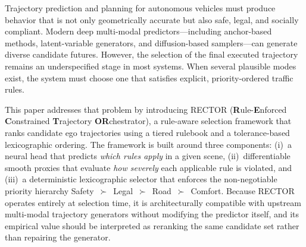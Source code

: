 Trajectory prediction and planning for autonomous vehicles must produce behavior that is not only geometrically accurate but also safe, legal, and socially compliant. Modern deep multi-modal predictors—including anchor-based methods, latent-variable generators, and diffusion-based samplers—can generate diverse candidate futures. However, the selection of the final executed trajectory remains an underspecified stage in most systems. When several plausible modes exist, the system must choose one that satisfies explicit, priority-ordered traffic rules.

This paper addresses that problem by introducing \textsc{RECTOR} (\textbf{R}ule-\textbf{E}nforced \textbf{C}onstrained \textbf{T}rajectory \textbf{OR}chestrator), a rule-aware selection framework that ranks candidate ego trajectories using a tiered rulebook and a tolerance-based lexicographic ordering.  The framework is built around three components: (i)~a neural head that predicts \emph{which rules apply} in a given scene, (ii)~differentiable smooth proxies that evaluate \emph{how severely} each applicable rule is violated, and (iii)~a deterministic lexicographic selector that enforces the non-negotiable priority hierarchy Safety~$\succ$~Legal~$\succ$~Road~$\succ$~Comfort.  Because RECTOR operates entirely at selection time, it is architecturally compatible with upstream multi-modal trajectory generators without modifying the predictor itself, and its empirical value should be interpreted as reranking the same candidate set rather than repairing the generator.

